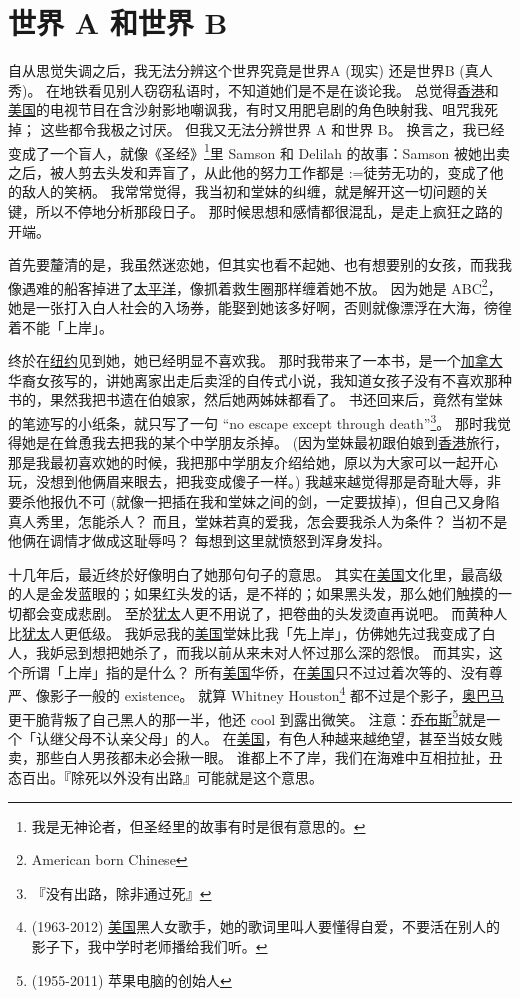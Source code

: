 \documentclass[12pt]{report}
\makeatletter
\renewcommand{\d}[1]{$\underaccent{\scalebox{0.5}{\textbullet}}{\textrm{#1}}$}
\newcommand{\ds}[1]{%
  \@tfor\next:=#1\do{\d{\next}}}
\makeatother
\begin{document}
\chapter{世界 A 和世界 B}

自从思觉失调之后，我无法分辨这个世界究竟是世界A (现实) 还是世界B (真人秀)。 在地铁看见别人窃窃私语时，不知道她们是不是在谈论我。 总觉得\uline{香港}和\uline{美国}的电视节目在含沙射影地嘲讽我，有时又用肥皂剧的角色映射我、咀咒我死掉； 这些都令我极之讨厌。 但我又无法分辨世界 A 和世界 B。 换言之，我已经变成了一个盲人，就像《圣经》\footnote{我是无神论者，但圣经里的故事有时是很有意思的。}里 Samson 和 Delilah 的故事：Samson 被她出卖之后，被人剪去头发和弄盲了，从此他的努力工作都是\ds{徒劳无功}的，变成了他的敌人的笑柄。 我常常觉得，我当初和堂妹的纠缠，就是解开这一切问题的关键，所以不停地分析那段日子。 那时候思想和感情都很混乱，是走上疯狂之路的开端。

首先要釐清的是，我虽然迷恋她，但其实也看不起她、也有想要别的女孩，而我我像遇难的船客掉进了\uline{太平洋}，像抓着救生圈那样缠着她不放。 因为她是 ABC\footnote{American born Chinese}，她是一张打入白人社会的入场券，能娶到她该多好啊，否则就像漂浮在大海，徬徨着不能「上岸」。

终於在\uline{纽约}见到她，她已经明显不喜欢我。 那时我带来了一本书，是一个\uline{加拿大}华裔女孩写的，讲她离家出走后卖淫的自传式小说，我知道女孩子没有不喜欢那种书的，果然我把书遗在伯娘家，然后她两姊妹都看了。 书还回来后，竟然有堂妹的笔迹写的小纸条，就只写了一句 ``no escape except through death''\footnote{『没有出路，除非通过死』}。 那时我觉得她是在耸恿我去把我的某个中学朋友杀掉。 (因为堂妹最初跟伯娘到\uline{香港}旅行，那是我最初喜欢她的时候，我把那中学朋友介绍给她，原以为大家可以一起开心玩，没想到他俩眉来眼去，把我变成傻子一样。) 我越来越觉得那是奇耻大辱，非要杀他报仇不可 (就像一把插在我和堂妹之间的剑，一定要拔掉)，但自己又身陷真人秀里，怎能杀人？ 而且，堂妹若真的爱我，怎会要我杀人为条件？ 当初不是他俩在调情才做成这耻辱吗？ 每想到这里就愤怒到浑身发抖。

十几年后，最近终於好像明白了她那句句子的意思。 其实在\uline{美国}文化里，最高级的人是金发蓝眼的；如果红头发的话，是不祥的；如果黑头发，那么她们触摸的一切都会变成悲剧。 至於\uline{犹太}人更不用说了，把卷曲的头发烫直再说吧。 而黄种人比\uline{犹太}人更低级。 我妒忌我的\uline{美国}堂妹比我「先上岸」，仿佛她先过我变成了白人，我妒忌到想把她杀了，而我以前从来未对人怀过那么深的怨恨。 而其实，这个所谓「上岸」指的是什么？ 所有\uline{美国}华侨，在\uline{美国}只不过过着次等的、没有尊严、像影子一般的 existence。 就算 Whitney Houston\footnote{(1963-2012) \uline{美国}黑人女歌手，她的歌词里叫人要懂得自爱，不要活在别人的影子下，我中学时老师播给我们听。} 都不过是个影子，\uline{奥巴马}更干脆背叛了自己黑人的那一半，他还 cool 到露出微笑。  注意：\uline{乔布斯}\footnote{(1955-2011) 苹果电脑的创始人}就是一个「认继父母不认亲父母」的人。 在\uline{美国}，有色人种越来越绝望，甚至当妓女贱卖，那些白人男孩都未必会揪一眼。 谁都上不了岸，我们在海难中互相拉扯，丑态百出。『除死以外没有出路』可能就是这个意思。
\end{document}
